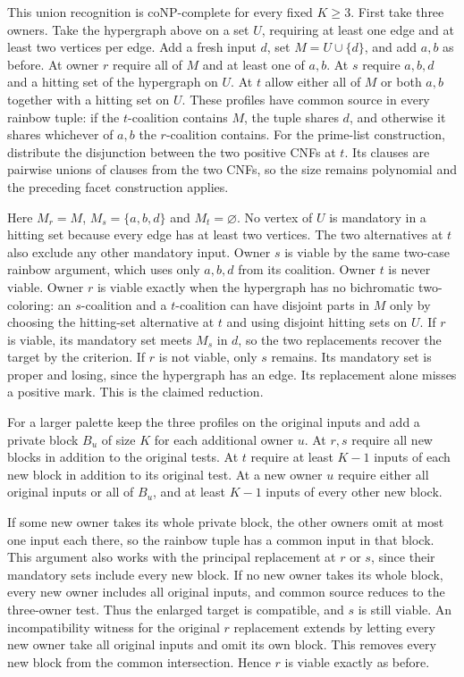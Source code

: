 This union recognition is coNP-complete for every fixed
$K\ge3$. First take three owners.
Take the hypergraph above on a set $U$, requiring at least
one edge and at least two vertices per edge. Add a fresh
input $d$, set $M=U\cup\{d\}$, and add $a,b$ as before.
At owner $r$ require all of $M$ and at least one of $a,b$.
At $s$ require $a,b,d$ and a hitting set of the hypergraph
on $U$. At $t$ allow either all of $M$ or both $a,b$
together with a hitting set on $U$.
These profiles have common source in every rainbow tuple:
if the $t$-coalition contains $M$, the tuple shares $d$,
and otherwise it shares whichever of $a,b$ the $r$-coalition
contains. For the prime-list construction, distribute the
disjunction between the two positive CNFs at $t$. Its
clauses are pairwise unions of clauses from the two CNFs,
so the size remains polynomial and the preceding
facet construction applies.

Here $M_r=M$, $M_s=\{a,b,d\}$ and $M_t=\varnothing$.
No vertex of $U$ is mandatory in a hitting set because
every edge has at least two vertices. The two alternatives
at $t$ also exclude any other mandatory input.
Owner $s$ is viable by the same two-case rainbow
argument, which uses only $a,b,d$ from its coalition.
Owner $t$ is never viable. Owner $r$ is viable exactly
when the hypergraph has no bichromatic two-coloring:
an $s$-coalition and a $t$-coalition can have disjoint parts
in $M$ only by choosing the hitting-set alternative at
$t$ and using disjoint hitting sets on $U$.
If $r$ is viable, its mandatory set meets $M_s$ in $d$,
so the two replacements recover the target by the criterion.
If $r$ is not viable, only $s$ remains. Its mandatory set
is proper and losing, since the hypergraph has an edge.
Its replacement alone misses a positive mark. This is the
claimed reduction.

For a larger palette keep the three profiles on the original
inputs and add a private block $B_u$ of size $K$ for each
additional owner $u$. At $r,s$ require all new blocks in
addition to the original tests. At $t$ require at least
$K-1$ inputs of each new block in addition to its original
test. At a new owner $u$ require either all original inputs
or all of $B_u$, and at least $K-1$ inputs of every other
new block.

If some new owner takes its whole private block, the other
owners omit at most one input each there, so the rainbow
tuple has a common input in that block. This argument also
works with the principal replacement at $r$ or $s$, since
their mandatory sets include every new block. If no new
owner takes its whole block, every new owner includes all
original inputs, and common source reduces to the three-owner
test. Thus the enlarged target is compatible, and $s$ is
still viable. An incompatibility witness for the original
$r$ replacement extends by letting every new owner take
all original inputs and omit its own block. This removes
every new block from the common intersection. Hence $r$
is viable exactly as before.

